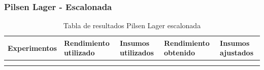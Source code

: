     
 \subsubsection{Pilsen Lager - Escalonada}
        \begin{longtable}{|p{2.7cm}|p{2.7cm}|p{2.7cm}|p{2.7cm}|p{2.7cm}|}
        \hline
        Experimentos & Rendimiento utilizado & Insumos utilizados & Rendimiento obtenido & Insumos ajustados\\
        \endfirsthead
        
        \endhead
 
        \endfoot
        
        \hline
        
        \caption{Tabla de resultados Pilsen Lager escalonada\label{tab:ResultadosPilsenEscalonada}}\\
        \endlastfoot
        

\end{longtable}
